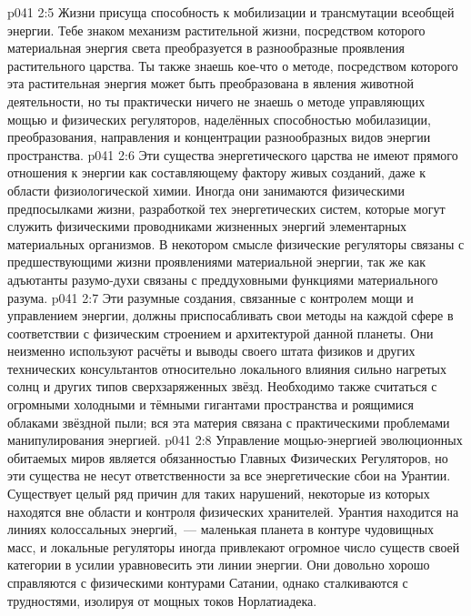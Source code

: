 \vs p041 2:5 Жизни присуща способность к мобилизации и трансмутации всеобщей энергии. Тебе знаком механизм растительной жизни, посредством которого материальная энергия света преобразуется в разнообразные проявления растительного царства. Ты также знаешь кое-что о методе, посредством которого эта растительная энергия может быть преобразована в явления животной деятельности, но ты практически ничего не знаешь о методе управляющих мощью и физических регуляторов, наделённых способностью мобилазиции, преобразования, направления и концентрации разнообразных видов энергии пространства.
\vs p041 2:6 \pc Эти существа энергетического царства не имеют прямого отношения к энергии как составляющему фактору живых созданий, даже к области физиологической химии. Иногда они занимаются физическими предпосылками жизни, разработкой тех энергетических систем, которые могут служить физическими проводниками жизненных энергий элементарных материальных организмов. В некотором смысле физические регуляторы связаны с предшествующими жизни проявлениями материальной энергии, так же как адъютанты разумо\hyp{}духи связаны с преддуховными функциями материального разума.
\vs p041 2:7 \pc Эти разумные создания, связанные с контролем мощи и управлением энергии, должны приспосабливать свои методы на каждой сфере в соответствии с физическим строением и архитектурой данной планеты. Они неизменно используют расчёты и выводы своего штата физиков и других технических консультантов относительно локального влияния сильно нагретых солнц и других типов сверхзаряженных звёзд. Необходимо также считаться с огромными холодными и тёмными гигантами пространства и роящимися облаками звёздной пыли; вся эта материя связана с практическими проблемами манипулирования энергией.
\vs p041 2:8 Управление мощью\hyp{}энергией эволюционных обитаемых миров является обязанностью Главных Физических Регуляторов, но эти существа не несут ответственности за все энергетические сбои на Урантии. Существует целый ряд причин для таких нарушений, некоторые из которых находятся вне области и контроля физических хранителей. Урантия находится на линиях колоссальных энергий,~--- маленькая планета в контуре чудовищных масс, и локальные регуляторы иногда привлекают огромное число существ своей категории в усилии уравновесить эти линии энергии. Они довольно хорошо справляются с физическими контурами Сатании, однако сталкиваются с трудностями, изолируя от мощных токов Норлатиадека.
